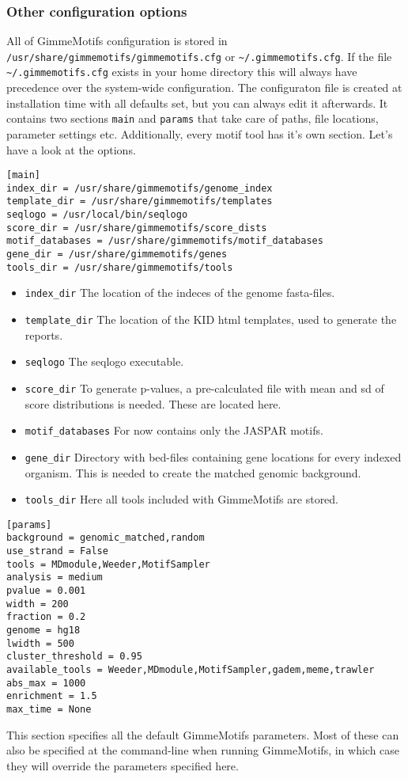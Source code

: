 \documentclass[11pt]{article}
\begin{document}
\subsubsection{Other configuration options}
All of GimmeMotifs configuration is stored in \texttt{/usr/share/gimmemotifs/gimmemotifs.cfg} or \texttt{\textasciitilde{}/.gimmemotifs.cfg}. If the file \texttt{\textasciitilde{}/.gimmemotifs.cfg} exists in your home directory this will always have precedence over the system-wide configuration.
The configuraton file is created at installation time with all defaults set, but you can always edit it afterwards. It contains two sections \texttt{main} and \texttt{params} that take care of paths, file locations, parameter settings etc. Additionally, every motif tool has it's own section.
Let's have a look at the options.
\begin{verbatim}
[main]
index_dir = /usr/share/gimmemotifs/genome_index
template_dir = /usr/share/gimmemotifs/templates
seqlogo = /usr/local/bin/seqlogo
score_dir = /usr/share/gimmemotifs/score_dists
motif_databases = /usr/share/gimmemotifs/motif_databases
gene_dir = /usr/share/gimmemotifs/genes
tools_dir = /usr/share/gimmemotifs/tools
\end{verbatim}
\begin{itemize}
 \item \texttt{index\_dir} The location of the indeces of the genome fasta-files.
 \item \texttt{template\_dir} The location of the KID html templates, used to generate the reports.
 \item \texttt{seqlogo} The seqlogo executable.
 \item \texttt{score\_dir} To generate p-values, a pre-calculated file with mean and sd of score distributions is needed. These are located here.
 \item \texttt{motif\_databases} For now contains only the JASPAR motifs.
 \item \texttt{gene\_dir} Directory with bed-files containing gene locations for every indexed organism. This is needed to create the matched genomic background.
 \item \texttt{tools\_dir} Here all tools included with GimmeMotifs are stored.
\end{itemize}

\begin{verbatim}
[params]
background = genomic_matched,random
use_strand = False
tools = MDmodule,Weeder,MotifSampler
analysis = medium
pvalue = 0.001
width = 200
fraction = 0.2
genome = hg18
lwidth = 500
cluster_threshold = 0.95
available_tools = Weeder,MDmodule,MotifSampler,gadem,meme,trawler
abs_max = 1000
enrichment = 1.5
max_time = None
\end{verbatim}
This section specifies all the default GimmeMotifs parameters. Most of these can also be specified at the command-line when running GimmeMotifs, in which case they will override the parameters specified here.
\end{document}
